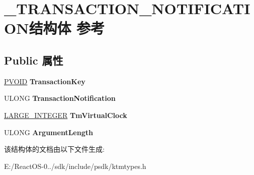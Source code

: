 \hypertarget{struct___t_r_a_n_s_a_c_t_i_o_n___n_o_t_i_f_i_c_a_t_i_o_n}{}\section{\+\_\+\+T\+R\+A\+N\+S\+A\+C\+T\+I\+O\+N\+\_\+\+N\+O\+T\+I\+F\+I\+C\+A\+T\+I\+O\+N结构体 参考}
\label{struct___t_r_a_n_s_a_c_t_i_o_n___n_o_t_i_f_i_c_a_t_i_o_n}
\subsection*{Public 属性}
\begin{DoxyCompactItemize}
\item 
\mbox{\label{struct___t_r_a_n_s_a_c_t_i_o_n___n_o_t_i_f_i_c_a_t_i_o_n_aeaa31eeff1579e92187b9cf0e9e43f50}} 
\hyperlink{interfacevoid}{P\+V\+O\+ID} {\bfseries Transaction\+Key}
\item 
\mbox{\label{struct___t_r_a_n_s_a_c_t_i_o_n___n_o_t_i_f_i_c_a_t_i_o_n_a40ccae2fe8bc5d474fe0f7ad7db95a3a}} 
U\+L\+O\+NG {\bfseries Transaction\+Notification}
\item 
\mbox{\label{struct___t_r_a_n_s_a_c_t_i_o_n___n_o_t_i_f_i_c_a_t_i_o_n_a7f1e2b1983900d885a45d161dfa4e12a}} 
\hyperlink{union___l_a_r_g_e___i_n_t_e_g_e_r}{L\+A\+R\+G\+E\+\_\+\+I\+N\+T\+E\+G\+ER} {\bfseries Tm\+Virtual\+Clock}
\item 
\mbox{\label{struct___t_r_a_n_s_a_c_t_i_o_n___n_o_t_i_f_i_c_a_t_i_o_n_ae92167a5eaae309957326dc75178b8ec}} 
U\+L\+O\+NG {\bfseries Argument\+Length}
\end{DoxyCompactItemize}


该结构体的文档由以下文件生成\+:\begin{DoxyCompactItemize}
\item 
E\+:/\+React\+O\+S-\/0../sdk/include/psdk/ktmtypes.\+h\end{DoxyCompactItemize}
